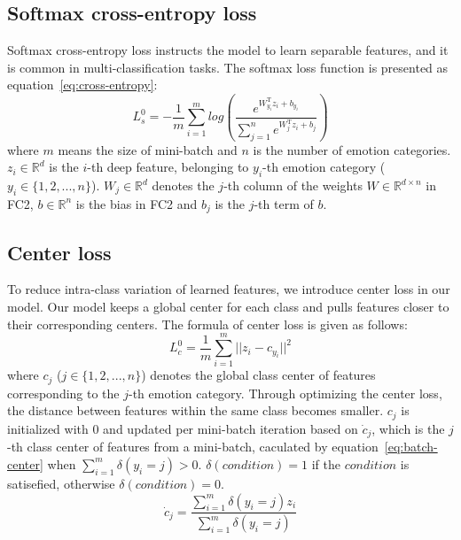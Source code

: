 \documentclass{article}
\begin{document}
\subsection{Softmax cross-entropy loss}
\label{ssec:cross-entropy}

Softmax cross-entropy loss instructs the model to learn separable features, and it is common in multi-classification tasks. The softmax loss function is presented as equation~\ref{eq:cross-entropy}:
\begin{equation} \label{eq:cross-entropy}
L_s^0 = - \frac{1}{m}\sum_{i=1}^{m}{log(\frac{e^{W_{y_i}^\mathrm{T}z_i+b_{y_i}}}{\sum_{j=1}^{n}e^{W_j^\mathrm{T}z_i+b_j}})}
\end{equation}
where $m$ means the size of mini-batch and $n$ is the number of emotion categories. $z_i \in \mathbb{R}^d$ is the $i$-th deep feature, belonging to $y_i$-th emotion category ($y_i \in  \{1, 2, ... , n\}$). $W_j \in \mathbb{R}^d$ denotes the $j$-th column of the weights $ W \in \mathbb{R}^{d \times n} $ in FC2, $b \in \mathbb{R} ^ n $ is the bias in FC2 and $ b_j $ is the $j$-th term of $b$.

\subsection{Center loss}
To reduce intra-class variation of learned features, we introduce center loss in our model. Our model keeps a global center for each class and pulls features closer to their corresponding centers. The formula of center loss is given as follows:
\begin{equation} \label{eq:center-loss}
L_c^0=\frac{1}{m}\sum_{i=1}^{m}||z_i - c_{y_i}||^2
\end{equation}
where $c_j$ ($j \in \{1, 2, ... , n\}$) denotes the global class center of features corresponding to the $j$-th emotion category. Through optimizing the center loss, the distance between features within the same class becomes smaller. $c_j$ is initialized with 0 and updated per mini-batch iteration based on $\dot{c}_j$, which is the $j$-th class center of features from a mini-batch, caculated by equation~\ref{eq:batch-center} when $\sum_{i=1}^{m}\delta(y_i = j) > 0$. $\delta(condition) = 1$ if the $condition$ is satisefied, otherwise $\delta(condition) = 0$.
\begin{equation} \label{eq:batch-center}
\dot{c}_j = \frac{\sum_{i=1}^{m}\delta(y_i = j) z_i}{\sum_{i=1}^{m}\delta(y_i = j)}
\end{equation}
\end{document}
